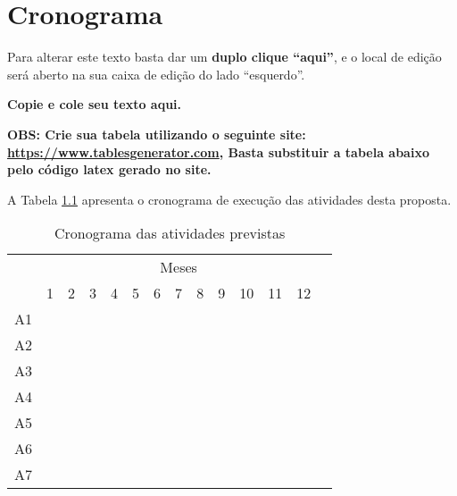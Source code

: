 \chapter{Cronograma}

Para alterar este texto basta dar um 
\textbf{duplo clique “aqui”}, e o local de edição será aberto na sua caixa de edição do lado “esquerdo”.

\textbf{Copie e cole seu texto aqui.}

\textbf{OBS: Crie sua tabela utilizando o seguinte site: \url{https://www.tablesgenerator.com}, Basta substituir a tabela abaixo pelo código latex gerado no site.}

A Tabela \ref{tab_cronograma} apresenta o cronograma de execução das atividades desta proposta.\\

\begin{table}[!htpb]
\centering
\caption{Cronograma das atividades previstas}
\setlength{\tabcolsep}{5pt} 
\begin{tabular}{|c|c|c|c|c|c|c|c|c|c|c|c|c|c|}\hline
 & \multicolumn{12}{c|}{Meses}\\ \cline{2-13}
\raisebox{1.5ex}{Etapa} & 1 & 2 & 3 & 4 & 5 & 6 & 7 & 8 & 9 & 10 & 11 & 12 \\ \hline \hline
A1 & \cellcolor{black} &   &   &   &   &   &   &   &   &   &   &   \\ \hline
A2 &   & \cellcolor{black} &   &   &   &   &   &   &   &   &   &   \\ \hline
A3 &   & \cellcolor{black} & \cellcolor{black} &   &   &   &   &   &   &   &   &   \\ \hline
A4 &   &   &   & \cellcolor{black} & \cellcolor{black} &   &   &   &   &   &   &   \\ \hline
A5 &   &   &   &   &   & \cellcolor{black} & \cellcolor{black} &   &   &   &   &   \\ \hline
A6 &   &   &   &   &   &   &   & \cellcolor{black} & \cellcolor{black} &   &   &   \\ \hline
A7 &   &   &   &   &   &   &   &   &   & \cellcolor{black} & \cellcolor{black} & \cellcolor{black} \\ \hline
\end{tabular} 
\label{tab_cronograma}
\end{table}